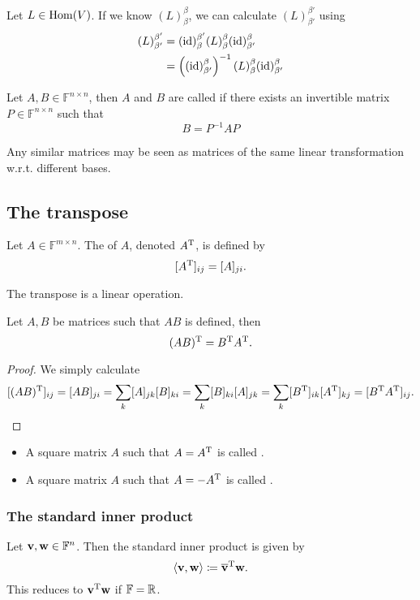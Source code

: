 Let $L\in \operatorname{Hom}(V)$. If we know $(L)_\beta^\beta$, we can calculate $(L)_{\beta'}^{\beta'}$ using
\begin{align*}
(L)_{\beta'}^{\beta'} &= (\operatorname{id})_{\beta}^{\beta'}(L)_\beta^\beta(\operatorname{id})_{\beta'}^{\beta} \\
&= \left((\operatorname{id})_{\beta'}^{\beta}\right)^{-1}(L)_\beta^\beta(\operatorname{id})_{\beta'}^{\beta}
\end{align*}
\begin{definition}
Let $A,B\in \mathbb{F}^{n\times n}$, then $A$ and $B$ are called  if there exists an invertible matrix $P\in\mathbb{F}^{n\times n}$ such that
\[ B = P^{-1}A P\] 
\end{definition}

Any similar matrices may be seen as matrices of the same linear transformation w.r.t. different bases.



\subsection{The transpose}
\begin{definition}
Let $A\in \mathbb{F}^{m\times n}$. The  of $A$, denoted $A^{\mathrm{T}}$, is defined by
\[ [A^{\mathrm{T}}]_{ij} = [A]_{ji}. \]
\end{definition}
\begin{lemma}
The transpose is a linear operation.
\end{lemma}

\begin{lemma}
Let $A,B$ be matrices such that $AB$ is defined, then
\[ (AB)^{\mathrm{T}} = B^{\mathrm{T}} A^{\mathrm{T}}. \]
\end{lemma}
\begin{proof}
We simply calculate
\[ [(AB)^{\mathrm{T}}]_{ij} = [AB]_{ji} = \sum_{k}[A]_{jk}[B]_{ki} = \sum_{k}[B]_{ki}[A]_{jk} = \sum_{k}[B^{\mathrm{T}}]_{ik}[A^{\mathrm{T}}]_{kj} = [B^{\mathrm{T}} A^{\mathrm{T}}]_{ij}. \]
\end{proof}

\begin{definition}
\begin{itemize}
\item A square matrix $A$ such that $A=A^{\mathrm{T}}$ is called .
\item A square matrix $A$ such that $A=-A^{\mathrm{T}}$ is called .
\end{itemize}
\end{definition}

\subsubsection{The standard inner product}
Let $\boldsymbol{\mathrm{v}},\boldsymbol{\mathrm{w}}\in\mathbb{F}^n$. Then the standard inner product is given by
\[ \left\langle \boldsymbol{\mathrm{v}},\boldsymbol{\mathrm{w}} \right\rangle \coloneqq \overline{\boldsymbol{\mathrm{v}}}^{\mathrm{T}} \boldsymbol{\mathrm{w}}. \]
This reduces to $\boldsymbol{\mathrm{v}}^{\mathrm{T}}\boldsymbol{\mathrm{w}}$ if $\mathbb{F} = \mathbb{R}$.

